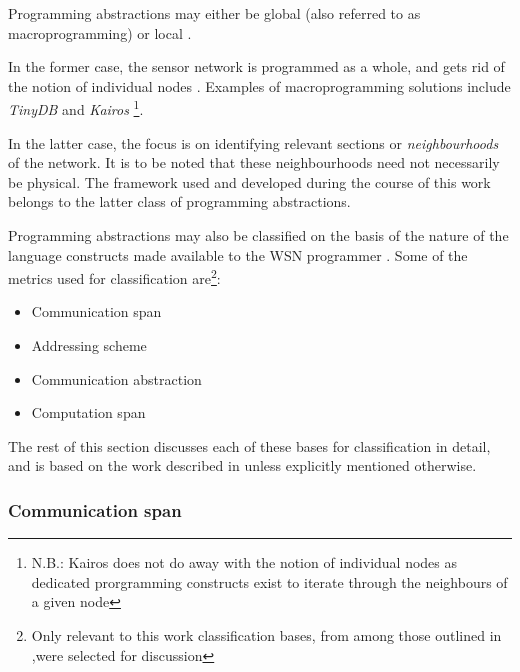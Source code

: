 Programming abstractions may either be global (also referred to 
as macroprogramming) or local \cite{hadim_middleware:2006}. 

In the former case, the sensor network is programmed as a whole, and gets rid of
the notion of individual nodes \cite{mottola_middleware:2008}. Examples of
macroprogramming solutions include \emph{TinyDB} \cite{madden_TinyDB:2005} and
\emph{Kairos} \cite{gummadi_Kairos:2005}\footnote{N.B.: Kairos does not do away
with the notion of individual nodes as dedicated prorgramming constructs exist to
iterate through the neighbours of a given node}. 

In the latter case, the focus is on identifying relevant sections or
\emph{neighbourhoods} of the network. It is to be noted that these neighbourhoods
need not necessarily be physical. The framework used and developed during the
course of this work belongs to the latter class of programming abstractions.

Programming abstractions may also be classified on the basis of the
nature of the language constructs made available to the WSN programmer
\cite{mottola_middleware:2008}. Some of the metrics used for classification
are\footnote{Only relevant to this work classification bases, from among those
outlined in \cite{mottola_middleware:2008},were selected for discussion}:

\begin{itemize}
  \item Communication span
  \item Addressing scheme
  \item Communication abstraction
  \item Computation span
\end{itemize}

The rest of this section discusses each of these bases for classification in
detail, and is based on the work described in \cite{mottola_middleware:2008}
unless explicitly mentioned otherwise.

\subsubsection{Communication span}

